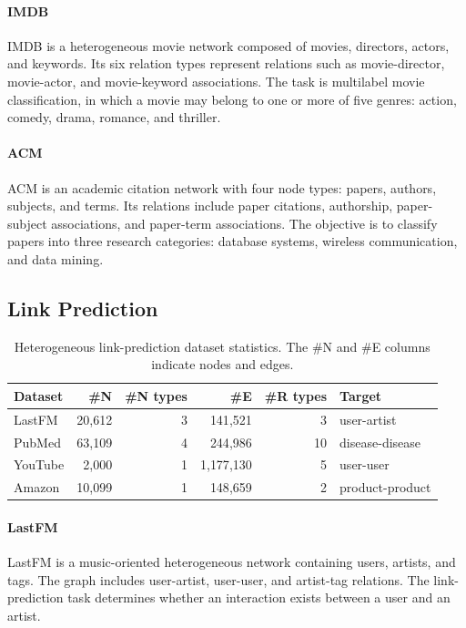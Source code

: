 \documentclass[sigconf,anonymous,review]{acmart}
\begin{document}
\paragraph{IMDB}
IMDB is a heterogeneous movie network composed of movies, directors, actors,
and keywords. Its six relation types represent relations such as movie-director,
movie-actor, and movie-keyword associations. The task is multilabel movie
classification, in which a movie may belong to one or more of five genres:
action, comedy, drama, romance, and thriller.

\paragraph{ACM}
ACM is an academic citation network with four node types: papers, authors,
subjects, and terms. Its relations include paper citations, authorship,
paper-subject associations, and paper-term associations. The objective is to
classify papers into three research categories: database systems, wireless
communication, and data mining.

\subsection{Link Prediction}

\begin{table}[htbp]
  \centering
  \caption{Heterogeneous link-prediction dataset statistics. The \#N and \#E columns
  indicate nodes and edges.}
  \label{tab:link-datasets}
  \scriptsize
  \resizebox{\columnwidth}{!}
  {%
  \begin{tabular}{lrrrrl}
    \toprule
    \textbf{Dataset} & \textbf{\#N} & \textbf{\#N types} & \textbf{\#E} &
    \textbf{\#R types} & \textbf{Target} \\
    \midrule
    LastFM & 20{,}612 & 3 & 141{,}521 & 3 & user-artist \\
    PubMed & 63{,}109 & 4 & 244{,}986 & 10 & disease-disease \\
    YouTube & 2{,}000 & 1 & 1{,}177{,}130 & 5 & user-user \\
    Amazon & 10{,}099 & 1 & 148{,}659 & 2 & product-product \\
    \bottomrule
  \end{tabular}%
  }
\end{table}

\paragraph{LastFM}
LastFM is a music-oriented heterogeneous network containing users, artists,
and tags. The graph includes user-artist, user-user, and artist-tag
relations. The link-prediction task determines whether an interaction exists
between a user and an artist.
\end{document}
